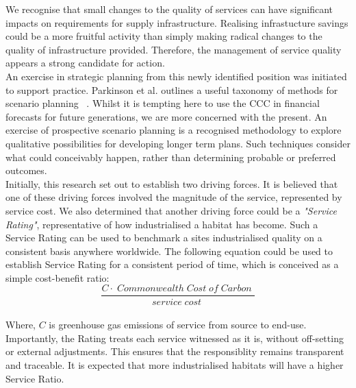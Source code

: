 We recognise that small changes to the quality of services can have significant impacts on requirements for supply infrastructure.
Realising infrastucture savings could be a more fruitful activity than simply making radical changes to the quality of infrastructure provided.
Therefore, the management of service quality appears a strong candidate for action.\\

An exercise in strategic planning from this newly identified position was initiated to support practice.
Parkinson et al. outlines a useful taxonomy of methods for scenario planning ~\cite{atp1}.
Whilst it is tempting here to use the CCC in financial forecasts for future generations, we are more concerned with the present.
An exercise of prospective scenario planning is a recognised methodology to explore qualitative possibilities for developing longer term plans.
Such techniques consider what could conceivably happen, rather than determining probable or preferred outcomes.\\

Initially, this research set out to establish two driving forces.
It is believed that one of these driving forces involved the magnitude of the service, represented by service cost.
We also determined that another driving force could be a \emph{"Service Rating"}, representative of how industrialised a habitat has become.
Such a Service Rating can be used to benchmark a sites industrialised quality on a consistent basis anywhere worldwide.
The following equation could be used to establish Service Rating for a consistent period of time, which is conceived as a simple cost-benefit ratio:\\

\begin{equation}
	\frac{C  \cdot \;Commonwealth\; Cost\; of\; Carbon\;}{service\; cost\;}
\end{equation}\\

Where, $C$ is greenhouse gas emissions of service from source to end-use.
Importantly, the Rating treats each service witnessed as it is, without off-setting or external adjustments.
This ensures that the responsiblity remains transparent and traceable.
It is expected that more industrialised habitats will have a higher Service Ratio.\\

